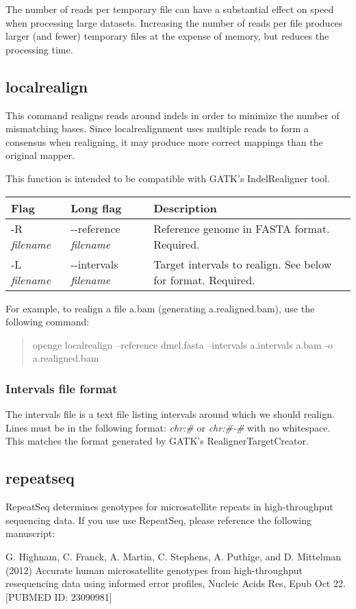 \documentclass[11pt]{article}
\newcommand {\cmd}[1] {\begin{quote}#1\end{quote}}
\begin{document}
The number of reads per temporary file can have a substantial effect on speed when processing large datasets. Increasing the number of reads per file produces larger (and fewer) temporary files at the expense of memory, but reduces the processing time.

\subsection {localrealign}
This command realigns reads around indels in order to minimize the number of mismatching bases. Since localrealignment uses multiple reads to form a consensus when realigning, it may produce more correct mappings than the original mapper.

This function is intended to be compatible with GATK's IndelRealigner tool.
\begin{center}
\begin{tabular}{llp{3.5in}}
\hline
Flag&Long flag&Description\\ \hline
-R \textit{filename}&{-}{-}reference \textit{filename}&Reference genome in FASTA format. Required.\\
-L \textit{filename}&{-}{-}intervals \textit{filename}&Target intervals to realign. See below for format. Required.\\
\end{tabular}
\end{center}

For example, to realign a file a.bam (generating a.realigned.bam), use the following command:
\cmd{openge localrealign --reference dmel.fasta --intervals a.intervals a.bam -o a.realigned.bam}

\subsubsection {Intervals file format}
The intervals file is a text file listing intervals around which we should realign. Lines must be in the following format:
\textit{chr:\#} or \textit{chr:\#-\#} with no whitespace. This matches the format generated by GATK's RealignerTargetCreator.

\subsection{repeatseq}
RepeatSeq determines genotypes for microsatellite repeats in high-throughput sequencing data. If you use use RepeatSeq, please reference the following manuscript:

G. Highnam, C. Franck, A. Martin, C. Stephens, A. Puthige, and D. Mittelman (2012) Accurate human microsatellite genotypes from high-throughput resequencing data using informed error profiles, Nucleic Acids Res, Epub Oct 22.  [PUBMED ID: 23090981]
\end{document}
